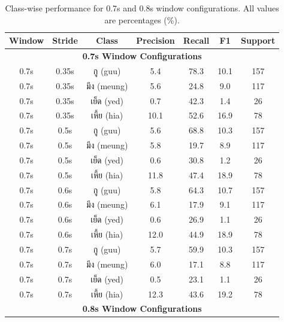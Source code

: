 \documentclass[11pt]{article}
\newcommand{\textthai}[1]{{\thaifont #1}}
\begin{document}
\begin{table}[H]
    \caption{Class-wise performance for 0.7s and 0.8s window configurations. All values are percentages (\%).}
    \centering
    \label{tab:class-performance-0.7-0.8}
    \scriptsize
    \setlength{\tabcolsep}{3pt}
    \begin{tabular}{|c|c|c|c|c|c|c|}
        \hline
        \textbf{Window} & \textbf{Stride} & \textbf{Class} & \textbf{Precision} & \textbf{Recall} & \textbf{F1} & \textbf{Support} \\
        \hline
        \multicolumn{7}{|c|}{\textbf{0.7s Window Configurations}} \\
        \hline
        0.7s & 0.35s & \textthai{กู} (guu) & 5.4 & 78.3 & 10.1 & 157 \\
        0.7s & 0.35s & \textthai{มึง} (meung) & 5.6 & 24.8 & 9.0 & 117 \\
        0.7s & 0.35s & \textthai{เย็ด} (yed) & 0.7 & 42.3 & 1.4 & 26 \\
        0.7s & 0.35s & \textthai{เหี้ย} (hia) & 10.1 & 52.6 & 16.9 & 78 \\
        \hline
        0.7s & 0.5s & \textthai{กู} (guu) & 5.6 & 68.8 & 10.3 & 157 \\
        0.7s & 0.5s & \textthai{มึง} (meung) & 5.8 & 19.7 & 8.9 & 117 \\
        0.7s & 0.5s & \textthai{เย็ด} (yed) & 0.6 & 30.8 & 1.2 & 26 \\
        0.7s & 0.5s & \textthai{เหี้ย} (hia) & 11.8 & 47.4 & 18.9 & 78 \\
        \hline
        0.7s & 0.6s & \textthai{กู} (guu) & 5.8 & 64.3 & 10.7 & 157 \\
        0.7s & 0.6s & \textthai{มึง} (meung) & 6.1 & 17.9 & 9.1 & 117 \\
        0.7s & 0.6s & \textthai{เย็ด} (yed) & 0.6 & 26.9 & 1.1 & 26 \\
        0.7s & 0.6s & \textthai{เหี้ย} (hia) & 12.0 & 44.9 & 18.9 & 78 \\
        \hline
        0.7s & 0.7s & \textthai{กู} (guu) & 5.7 & 59.9 & 10.3 & 157 \\
        0.7s & 0.7s & \textthai{มึง} (meung) & 6.0 & 17.1 & 8.8 & 117 \\
        0.7s & 0.7s & \textthai{เย็ด} (yed) & 0.5 & 23.1 & 1.1 & 26 \\
        0.7s & 0.7s & \textthai{เหี้ย} (hia) & 12.3 & 43.6 & 19.2 & 78 \\
        \hline
        \multicolumn{7}{|c|}{\textbf{0.8s Window Configurations}} \\

\end{tabular}
\end{table}
\end{document}
